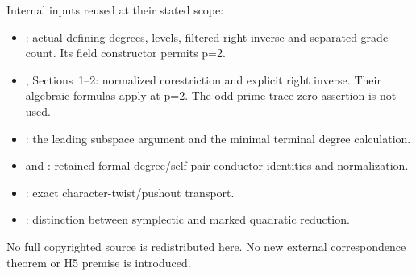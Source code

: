 Internal inputs reused at their stated scope:

\begin{itemize}
\tightlist
\item
  : actual defining degrees,
  levels, filtered right inverse and separated grade count. Its field constructor permits p=2.
\item
  , Sections~1--2:
  normalized corestriction and explicit right inverse. Their algebraic formulas apply at p=2. The odd-prime trace-zero assertion is not used.
\item
  : the leading
  subspace argument and the minimal terminal degree calculation.
\item
   and
  :
  retained formal-degree/self-pair conductor identities and
  normalization.
\item
  : exact character-twist/pushout
  transport.
\item
  :
  distinction between symplectic and marked quadratic reduction.
\end{itemize}

No full copyrighted source is redistributed here. No new external
correspondence theorem or H5 premise is introduced.

